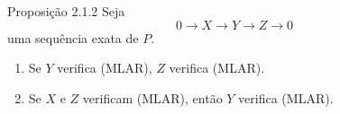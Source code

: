 \begin{statement}{Proposição 2.1.2}
Seja
\[
0\longrightarrow X\longrightarrow Y\longrightarrow Z\longrightarrow0
\]
uma sequência exata de $P$.
\begin{enumerate}[label=(\roman*)]
\item Se $Y$ verifica (MLAR), $Z$ verifica (MLAR).
\item Se $X$ e $Z$ verificam (MLAR), então $Y$ verifica (MLAR).
\end{enumerate}
\end{statement}
